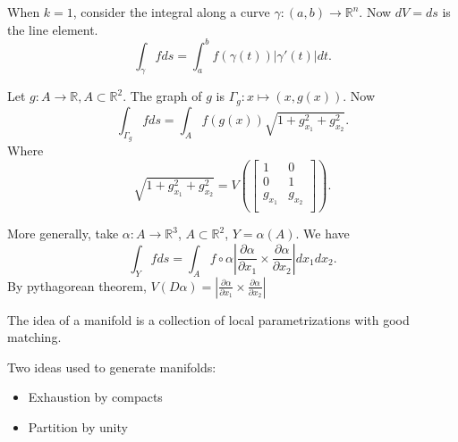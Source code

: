 \begin{example}
	When $k=1$, consider the integral along a curve  $\gamma: (a,b) \to \mathbb{R}^n$. Now $dV = ds$ is the line element.
	\[
		\int _\gamma f ds = \int _a^b f\left(\gamma(t)\right) |\gamma'(t)| dt
	.\] 
\end{example}
\begin{example}
	Let $g: A \to \mathbb{R}, A \subset \mathbb{R}^2$. The graph of $g$ is $\Gamma_g: x \mapsto (x, g(x))$. Now
	\[
		\int _{\Gamma_g} f ds = \int _A f\left( g(x) \right) \sqrt{1 + g_{x_1}^2 + g_{x_2}^2} 
	.\] 
	Where
	\[
		\sqrt{1 + g_{x_1}^2 + g_{x_2}^2} = V\left( 
	\begin{bmatrix}
		1 & 0 \\
		0 & 1 \\
		g_{x_1} & g_{x_2} \\
	\end{bmatrix}
		\right) 
	.\] 
\end{example}
\begin{example}
	More generally, take $\alpha: A \to \mathbb{R}^3$, $A \subset \mathbb{R}^2$, $Y = \alpha(A)$. We have
	\[
		\int _Y f ds = \int _A f \circ \alpha \left|  \frac{\partial \alpha}{\partial x_1} \times  \frac{\partial \alpha}{\partial x_2}  \right|  dx_1 dx_2
	.\] 
	By pythagorean theorem, $V(D\alpha) = \left|  \frac{\partial \alpha}{\partial x_1} \times  \frac{\partial \alpha}{\partial x_2}  \right|$
\end{example}

\begin{intuition}
	The idea of a manifold is a collection of local parametrizations with good matching.
\end{intuition}

Two ideas used to generate manifolds:
\begin{itemize}
	\item Exhaustion by compacts
	\item Partition by unity
\end{itemize}

